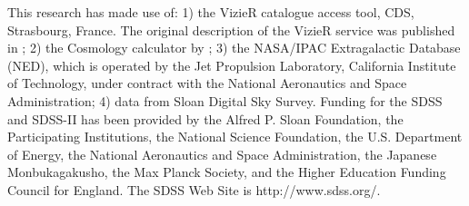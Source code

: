 \documentclass{aa}
\begin{document}
 This research has made use of: 1) the VizieR catalogue access tool, CDS,
 Strasbourg, France. The original description of the VizieR service was
 published in \cite{Ochsenbein2000};   
2) the Cosmology calculator by \cite{Wright2006};
3) the NASA/IPAC Extragalactic Database (NED), which is operated by the Jet Propulsion Laboratory, California Institute of Technology, under contract with the National Aeronautics and Space Administration; 4) data from Sloan Digital Sky Survey. Funding for the SDSS and SDSS-II has been provided by the Alfred P. Sloan Foundation, the Participating Institutions, the National Science Foundation, the U.S. Department of Energy, the National Aeronautics and Space Administration, the Japanese Monbukagakusho, the Max Planck Society, and the Higher Education Funding Council for England. The SDSS Web Site is http://www.sdss.org/.
\end{document}

